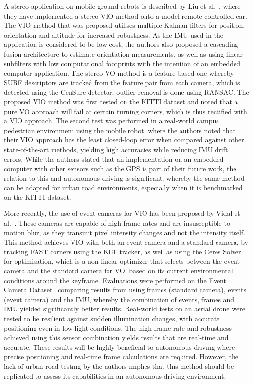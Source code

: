 A stereo application on mobile ground robots is described by Liu et al.~\cite{liu_stereo_2016}, where they have implemented a stereo VIO method onto a model remote controlled car. The VIO method that was proposed utilises multiple Kalman filters for position, orientation and altitude for increased robustness. As the IMU used in the application is considered to be low-cost, the authors also proposed a cascading fusion architecture to estimate orientation measurements, as well as using linear subfilters with low computational footprints with the intention of an embedded computer application. The stereo VO method is a feature-based one whereby SURF descriptors are tracked from the feature pair from each camera, which is detected using the CenSure detector; outlier removal is done using RANSAC. The proposed VIO method was first tested on the KITTI dataset and noted that a pure VO approach will fail at certain turning corners, which is thus rectified with a VIO approach. The second test was performed in a real-world campus pedestrian environment using the mobile robot, where the authors noted that their VIO approach has the least closed-loop error when compared against other state-of-the-art methods, yielding high accuracies while reducing IMU drift errors. While the authors stated that an implementation on an embedded computer with other sensors such as the GPS is part of their future work, the relation to this and autonomous driving is significant, whereby the same method can be adapted for urban road environments, especially when it is benchmarked on the KITTI dataset.

More recently, the use of event cameras for VIO has been proposed by Vidal et al.~\cite{vidal_ultimate_2018}. These cameras are capable of high frame rates and are insusceptible to motion blur, as they transmit pixel intensity changes and not the intensity itself. This method achieves VIO with both an event camera and a standard camera, by tracking FAST corners using the KLT tracker, as well as using the Ceres Solver~\cite{agarwal_ceres_nodate} for optimisation, which is a non-linear optimizer that selects between the event camera and the standard camera for VO, based on its current environmental conditions around the keyframe. Evaluations were performed on the Event Camera Dataset~\cite{mueggler_event-camera_2017} comparing results from using frames (standard camera), events (event camera) and the IMU, whereby the combination of events, frames and IMU yielded significantly better results. Real-world tests on an aerial drone were tested to be resilient against sudden illumination changes, with accurate positioning even in low-light conditions. The high frame rate and robustness achieved using this sensor combination yields results that are real-time and accurate. These results will be highly beneficial to autonomous driving where precise positioning and real-time frame calculations are required. However, the lack of urban road testing by the authors implies that this method should be replicated to assess its capabilities in an autonomous driving environment. 

